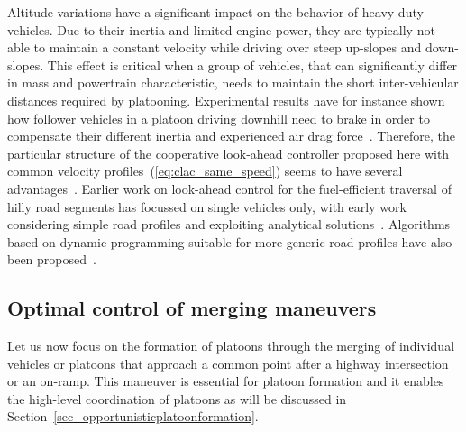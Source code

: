 \documentclass[journal]{IEEEtran}
\begin{document}
Altitude variations have a significant impact on the behavior of heavy-duty vehicles. Due to their inertia and limited engine power, they are typically not able to maintain a constant velocity while driving over steep up-slopes and down-slopes. This effect is critical when a group of vehicles, that can significantly differ in mass and powertrain characteristic, needs to maintain the short inter-vehicular distances required by platooning. Experimental results have for instance shown how follower vehicles in a platoon driving downhill need to brake in order to compensate their different inertia and experienced air drag force~\cite{alam_2015b}. Therefore, the particular structure of the cooperative look-ahead controller proposed here with common velocity profiles~(\ref{eq:clac_same_speed}) seems to have several advantages~\cite{turri_2015}. Earlier work on look-ahead control for the fuel-efficient traversal of hilly road segments has focussed on single vehicles only, with early work considering simple road profiles and exploiting analytical solutions~\cite{schwarzkopf_1977,stoicescu1995fuel}. Algorithms based on dynamic programming suitable for more generic road profiles have also been proposed~\cite{hooker1988optimal,monastyrsky1993rapid,hellstrom_2009}.


\subsection{Optimal control of merging maneuvers}\label{sec_merging}
Let us now focus on the formation of platoons through the merging of individual vehicles or platoons that approach a common point after a highway intersection or an on-ramp. This maneuver is essential for platoon formation and it enables the high-level coordination of platoons as will be discussed in Section~\ref{sec_opportunisticplatoonformation}.
\end{document}
